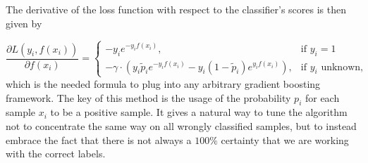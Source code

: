 The derivative of the loss function with respect to the classifier's scores is then given by 

\begin{equation*}
 \frac{\partial L(y_i,f(x_i))}{\partial f(x_i)} = 
    \begin{cases}
	-y_i e^{-y_i f(x_i)}, & \text{if $y_i = 1$}\\
	-\gamma \cdot \left(y_i \tilde p_i e^{-y_i f(x_i)} - y_i (1 - \tilde p_i) e^{y_i f(x_i)} \right), & \text{if $y_i$ unknown},
      \end{cases}
\end{equation*}
which is the needed formula to plug into any arbitrary gradient boosting framework.
The key of this method is the usage of the probability $p_i$ for each sample $x_i$ to be a positive sample. 
It gives a natural way to tune the algorithm not to concentrate the same way on all wrongly classified samples, but to instead embrace the fact that there is not always a $100\%$ certainty that we are working with the correct labels.

